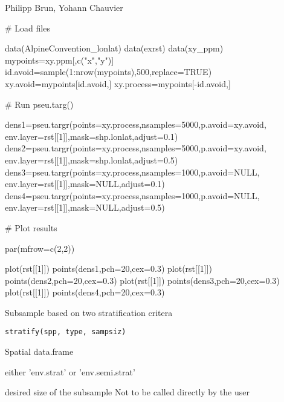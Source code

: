 \documentclass[a4paper]{book}
\begin{document}
%
\begin{Author}\relax
Philipp Brun, Yohann Chauvier
\end{Author}
%
\begin{Examples}
\begin{ExampleCode}

# Load files

data(AlpineConvention_lonlat)
data(exrst)
data(xy_ppm)
mypoints=xy.ppm[,c("x","y")]
id.avoid=sample(1:nrow(mypoints),500,replace=TRUE)
xy.avoid=mypoints[id.avoid,]
xy.process=mypoints[-id.avoid,]

# Run pseu.targ()

dens1=pseu.targr(points=xy.process,nsamples=5000,p.avoid=xy.avoid,
                 env.layer=rst[[1]],mask=shp.lonlat,adjust=0.1)
dens2=pseu.targr(points=xy.process,nsamples=5000,p.avoid=xy.avoid,
                 env.layer=rst[[1]],mask=shp.lonlat,adjust=0.5)
dens3=pseu.targr(points=xy.process,nsamples=1000,p.avoid=NULL,
                 env.layer=rst[[1]],mask=NULL,adjust=0.1)
dens4=pseu.targr(points=xy.process,nsamples=1000,p.avoid=NULL,
                 env.layer=rst[[1]],mask=NULL,adjust=0.5)

# Plot results

par(mfrow=c(2,2))

plot(rst[[1]])
points(dens1,pch=20,cex=0.3)
plot(rst[[1]])
points(dens2,pch=20,cex=0.3)
plot(rst[[1]])
points(dens3,pch=20,cex=0.3)
plot(rst[[1]])
points(dens4,pch=20,cex=0.3)

\end{ExampleCode}
\end{Examples}
%
\begin{Description}\relax
Subsample based on two stratification critera
\end{Description}
%
\begin{Usage}
\begin{verbatim}
stratify(spp, type, sampsiz)
\end{verbatim}
\end{Usage}
%
\begin{Arguments}
\begin{ldescription}
\item[\code{spp}] Spatial data.frame

\item[\code{type}] either 'env.strat' or 'env.semi.strat'

\item[\code{sampsiz}] desired size of the subsample
Not to be called directly by the user
\end{ldescription}
\end{Arguments}
\end{document}
